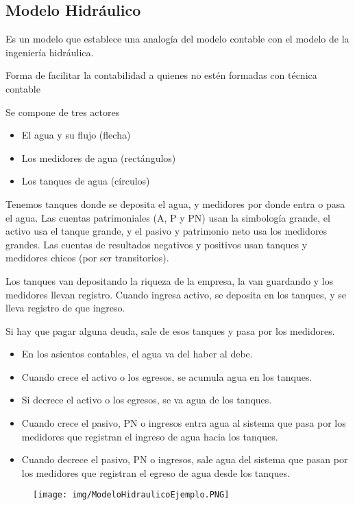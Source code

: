 \documentclass[titlepage,a4paper]{article}
\begin{document}
\subsection{Modelo Hidráulico}
Es un modelo que establece una analogía del modelo contable con el modelo de la ingeniería hidráulica.

Forma de facilitar la contabilidad a quienes no estén formadas con técnica contable

Se compone de tres actores
\begin{itemize}
\item El agua y su flujo (flecha)
\item Los medidores de agua (rectángulos)
\item Los tanques de agua (círculos)
\end{itemize}


Tenemos tanques donde se deposita el agua, y medidores por donde entra o pasa el agua. Las cuentas patrimoniales (A, P y PN) usan la simbología grande, el activo usa el tanque grande, y el pasivo y patrimonio neto usa los medidores grandes. Las cuentas de resultados negativos y positivos usan tanques y medidores chicos (por ser transitorios). 

Los tanques van depositando la riqueza de la empresa, la van guardando y los medidores llevan registro. Cuando ingresa activo, se deposita en los tanques, y se lleva registro de que ingreso.

Si hay que pagar alguna deuda, sale de esos tanques y pasa por los medidores.

\begin{itemize}
\item En los asientos contables, el agua va del haber al debe. 
\item Cuando crece el activo o los egresos, se acumula agua en los tanques. 
\item Si decrece el activo o los egresos, se va agua de los tanques.
\item Cuando crece el pasivo, PN o ingresos entra agua al sistema que pasa por los medidores que registran el ingreso de agua hacia los tanques. 
\item Cuando decrece el pasivo, PN o ingresos, sale agua del sistema que pasan por los medidores que registran el egreso de agua desde los tanques.
\end{itemize}

\begin{figure}[!htb]
    \centering
    \texttt{[image: img/ModeloHidraulicoEjemplo.PNG]}
\end{figure}
\end{document}
